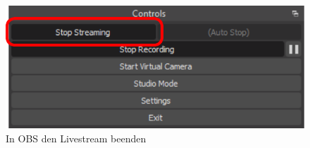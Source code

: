 \begin{figure}[H]
	\centering
	\includegraphics[width=\textwidth]{figures/obs-interface-stream-stop}
	
	\caption{In OBS den Livestream beenden}
	\label{fig:obs:interface:stream-stop}
\end{figure}
